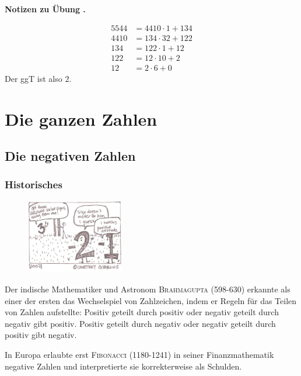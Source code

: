 \documentclass[%
11pt,%
twoside,%
titlepage,%
swissgerman,%
headsepline%
]{scrartcl}
\newcommand{\faReturnGray}{\textcolor{gray}{\faMailReply}} %
\theoremstyle{definition}
\theoremstyle{plain}
\newcommand{\concatueb}[1]{ueb:#1}%
\newcommand{\concatlsg}[1]{lsg:#1}%
\newcounter{uebcounter}[section]
\renewcommand{\theuebcounter}{\thesection.\arabic{uebcounter}}  %
\newenvironment{lsg}[1]{%
    \par\noindent\textbf{Notizen zu Übung \theuebcounter\label{\concatlsg{#1}}}
    \hfill\hyperref[\concatueb{#1}]{\faReturnGray}\par %
}{%
    \par%
}
\begin{document}
\begin{lsg}{euklidbsp}
\begin{align*}
    5544 &= 4410\cdot1+134\\
    4410 &= 134\cdot32+122\\
    134 &= 122\cdot1+12\\
    122 &= 12\cdot10+2\\
    12 &= 2\cdot6+0
\end{align*}
Der ggT ist also $2$.
\end{lsg}

\clearpage

\section{Die ganzen Zahlen}
\subsection{Die negativen Zahlen}
\subsubsection{Historisches}

\begin{figure}
\vspace{-22pt}
  \begin{center}
    \includegraphics[width=0.38\textwidth]{pictures/negative}
  \end{center}
\vspace{-22pt}
\end{figure}
Der indische Mathematiker und Astronom \textsc{Brahmagupta} (598-630) erkannte als einer der ersten das Wechselspiel von Zahlzeichen, indem er Regeln für das Teilen von Zahlen aufstellte: \glqq Positiv geteilt durch positiv oder negativ geteilt durch
negativ gibt positiv. Positiv geteilt durch negativ oder negativ geteilt durch positiv gibt negativ.\grqq

In Europa erlaubte erst \textsc{Fibonacci} (1180-1241) in seiner Finanzmathematik negative Zahlen und interpretierte sie korrekterweise als Schulden.
\end{document}
